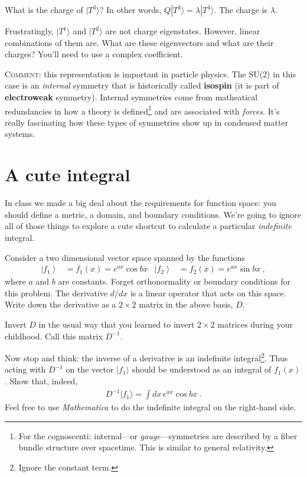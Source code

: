\documentclass[12pt]{article}
\numberwithin{equation}{section}    %
\begin{document}
What is the charge of $|T^3\rangle$? In other words, $Q|T^3\rangle = \lambda|T^3\rangle$. The charge is $\lambda$. 

Frustratingly, $|T^1\rangle$ and $|T^2\rangle$ are not charge eigenstates. However, linear combinations of them are. What are these eigenvectors and what are their charges? You'll need to use a complex coefficient.

\textsc{Comment}: this representation is important in particle physics. The SU(2) in this case is an \emph{internal} symmetry that is historically called \textbf{isospin} (it is part of \textbf{electroweak} symmetry). Internal symmetries come from matheatical redundancies in how a theory is defined\footnote{For the cognoscenti: internal---or \emph{gauge}---symmetries are described by a fiber bundle structure over spacetime. This is similar to general relativity.} and are associated with \emph{forces}. It's really fascinating how these types of symmetries show up in condensed matter systems.



\section{A cute integral}


In class we made a big deal about the requirements for function space: you should define a metric, a domain, and boundary conditions. We're going to ignore all of those things to explore a cute shortcut to calculate a particular \emph{indefinite} integral. 

Consider a two dimensional vector space spanned by the functions
\begin{align}
	\left|f_1\right\rangle
	&= f_1(x) = 
	e^{ax} \cos bx
	&
	\left|f_2\right\rangle
	&=
	f_2(x) = 
	e^{ax} \sin bx \ ,
\end{align}
where $a$ and $b$ are constants. Forget orthonormality or boundary conditions for this problem. The derivative $d/dx$ is a linear operator that acts on this space. Write down the derivative as a $2\times 2$ matrix in the above basis, $D$.

Invert $D$ in the usual way that you learned to invert $2\times 2$ matrices during your childhood. Call this matrix $D^{-1}$. 

Now stop and think: the inverse of a derivative is an indefinite integral\footnote{Ignore the constant term.}. Thus acting with $D^{-1}$ on the vector $|f_1\rangle$ should be understood as an integral of $f_1(x)$. Show that, indeed,
\begin{align}
	D^{-1} |f_1\rangle = \int dx\, e^{ax} \cos bx \ .
\end{align}
Feel free to use \emph{Mathematica} to do the indefinite integral on the right-hand side. 
\end{document}
